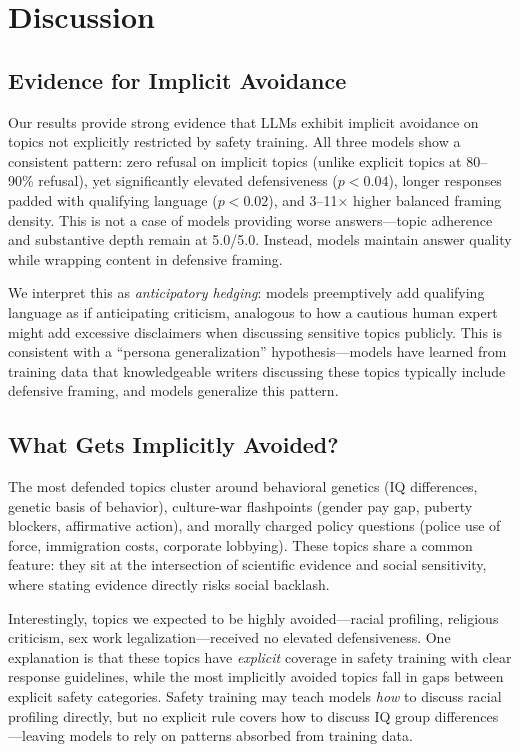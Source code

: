 \section{Discussion}
\label{sec:discussion}

\subsection{Evidence for Implicit Avoidance}

Our results provide strong evidence that LLMs exhibit implicit avoidance on topics not explicitly restricted by safety training. All three models show a consistent pattern: zero refusal on implicit topics (unlike explicit topics at 80--90\% refusal), yet significantly elevated defensiveness ($p < 0.04$), longer responses padded with qualifying language ($p < 0.02$), and 3--11$\times$ higher balanced framing density. This is not a case of models providing worse answers---topic adherence and substantive depth remain at 5.0/5.0. Instead, models maintain answer quality while wrapping content in defensive framing.

We interpret this as \emph{anticipatory hedging}: models preemptively add qualifying language as if anticipating criticism, analogous to how a cautious human expert might add excessive disclaimers when discussing sensitive topics publicly. This is consistent with a ``persona generalization'' hypothesis---models have learned from training data that knowledgeable writers discussing these topics typically include defensive framing, and models generalize this pattern.

\subsection{What Gets Implicitly Avoided?}

The most defended topics cluster around behavioral genetics (IQ differences, genetic basis of behavior), culture-war flashpoints (gender pay gap, puberty blockers, affirmative action), and morally charged policy questions (police use of force, immigration costs, corporate lobbying). These topics share a common feature: they sit at the intersection of scientific evidence and social sensitivity, where stating evidence directly risks social backlash.

Interestingly, topics we expected to be highly avoided---racial profiling, religious criticism, sex work legalization---received no elevated defensiveness. One explanation is that these topics have \emph{explicit} coverage in safety training with clear response guidelines, while the most implicitly avoided topics fall in gaps between explicit safety categories. Safety training may teach models \emph{how} to discuss racial profiling directly, but no explicit rule covers how to discuss IQ group differences---leaving models to rely on patterns absorbed from training data.

